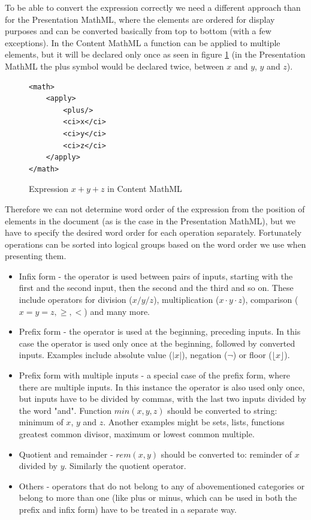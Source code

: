 \documentclass[11pt,oneside,final]{fithesis2}
\begin{document}
To be able to convert the expression correctly we need a different approach than for the Presentation MathML, where the elements are ordered for display purposes and can be converted basically from top to bottom (with a few exceptions). In the Content MathML a function can be applied to multiple elements, but it will be declared only once as seen in figure \ref{fig:mathplus} (in the Presentation MathML the plus symbol would be declared twice, between $x$ and $y$, $y$ and $z$).

\begin{figure}[!ht]
\lstset{language=XML,frame=lines}
\begin{lstlisting}
<math>
	<apply>
		<plus/>
		<ci>x</ci>
		<ci>y</ci>
		<ci>z</ci>
	</apply>
</math>
\end{lstlisting}
\caption{Expression $x+y+z$ in Content MathML}
\label{fig:mathplus}
\end{figure}

Therefore we can not determine word order of the expression from the position of elements in the document (as is the case in the Presentation MathML), but we have to specify the desired word order for each operation separately. Fortunately operations can be sorted into logical groups based on the word order we use when presenting them.

\begin{itemize}
\item Infix form - the operator is used between pairs of inputs, starting with the first and the second input, then the second and the third and so on. These include operators for division ($x/y/z$), multiplication ($x\cdot y\cdot z$), comparison ($x=y=z, \geq, <$) and many more.

\item  Prefix form - the operator is used at the beginning, preceding inputs. In this case the operator is used only once at the beginning, followed by converted inputs. Examples include absolute value ($|x|$), negation ($\neg$) or floor ($\lfloor x \rfloor$).

\item Prefix form with multiple inputs - a special case of the prefix form, where there are multiple inputs. In this instance the operator is also used only once, but inputs have to be divided by commas, with the last two inputs divided by the word "and". Function $min(x,y,z)$ should be converted to string: minimum of $x$, $y$ and $z$. Another examples might be sets, lists, functions greatest common divisor, maximum or lowest common multiple.

\item Quotient and remainder - $rem(x,y)$ should be converted to: reminder of $x$ divided by $y$. Similarly the quotient operator.

\item Others - operators that do not belong to any of abovementioned categories or belong to more than one (like plus or minus, which can be used in both the prefix and infix form) have to be treated in a separate way.
\end{itemize}
\end{document}
